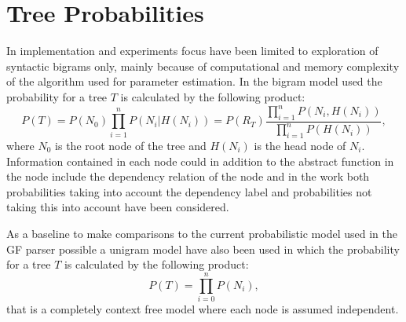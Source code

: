 \section{Tree Probabilities}


In implementation and experiments focus have been limited to exploration of syntactic bigrams only, mainly because of computational and memory complexity of the algorithm used for parameter estimation. In the bigram model used the probability for a tree $T$ is calculated by the following product:
\begin{equation}
    P(T)=P(N_0)\prod_{i=1}^{n} P(N_i|H(N_i))=P(R_T)\frac{\prod_{i=1}^{n} P(N_i,H(N_i))}{\prod_{i=1}^{n} P(H(N_i))},
\end{equation}
where $N_0$ is the root node of the tree and $H(N_i)$ is the head node of $N_i$. Information contained in each node could in addition to the abstract function in the node include the dependency relation of the node and in the work both probabilities taking into account the dependency label and probabilities not taking this into account have been considered.

As a baseline to make comparisons to the current probabilistic model used in the GF parser possible a unigram model have also been used in which the probability for a tree $T$ is calculated by the following product:
\begin{equation}
    P(T)=\prod_{i=0}^{n} P(N_i),
\end{equation}
that is a completely context free model where each node is assumed independent.






